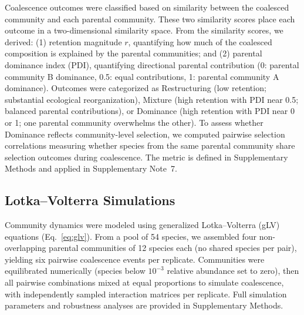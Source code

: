 Coalescence outcomes were classified based on similarity between the coalesced community and each parental community.  These two similarity scores place each outcome in a two-dimensional similarity space. From the similarity scores, we derived: (1) retention magnitude $r$, quantifying how much of the coalesced composition is explained by the parental communities; and (2) parental dominance index (PDI), quantifying directional parental contribution (0: parental community B dominance, 0.5: equal contributions, 1: parental community A dominance).  Outcomes were categorized as Restructuring (low retention; substantial ecological reorganization), Mixture (high retention with PDI near 0.5; balanced parental contributions), or Dominance (high retention with PDI near 0 or 1; one parental community overwhelms the other). To assess whether Dominance reflects community-level selection, we computed pairwise selection correlations measuring whether species from the same parental community share selection outcomes during coalescence. The metric is defined in Supplementary Methods and applied in Supplementary Note~7.


\subsection*{Lotka--Volterra Simulations}
\label{sec:methods:simulations}

Community dynamics were modeled using generalized Lotka--Volterra (gLV) equations (Eq.~\ref{eq:glv}).  From a pool of 54 species, we assembled four non-overlapping parental communities of 12 species each (no shared species per pair), yielding six pairwise coalescence events per replicate.  Communities were equilibrated numerically (species below $10^{-3}$ relative abundance set to zero), then all pairwise combinations mixed at equal proportions to simulate coalescence, with independently sampled interaction matrices per replicate. Full simulation parameters and robustness analyses are provided in Supplementary Methods.


